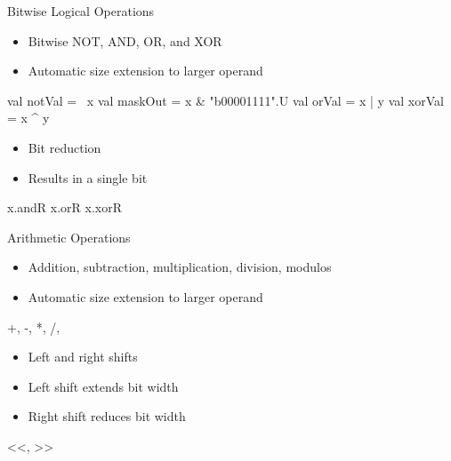 \begin{frame}[fragile]{Bitwise Logical Operations}
\begin{itemize}
\item Bitwise NOT, AND, OR, and XOR
\item Automatic size extension to larger operand
\end{itemize}
\begin{chisel}
val notVal = ~x
val maskOut = x & "b00001111".U
val orVal = x | y
val xorVal = x ^ y
\end{chisel}
\begin{itemize}
\item Bit reduction
\item Results in a single bit
\end{itemize}
\begin{chisel}
x.andR
x.orR
x.xorR
\end{chisel}
\end{frame}

\begin{frame}[fragile]{Arithmetic Operations}
\begin{itemize}
\item Addition, subtraction, multiplication, division, modulos
\item Automatic size extension to larger operand
\end{itemize}
\begin{chisel}
+, -, *, /, %
\end{chisel}
\begin{itemize}
\item Left and right shifts
\item Left shift extends bit width
\item Right shift reduces bit width
\end{itemize}
\begin{chisel}
<<, >>
\end{chisel}
\end{frame}


